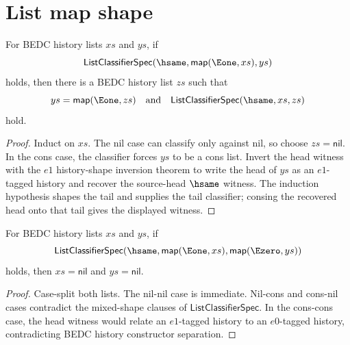 \section{List map shape}
\label{sec:list-map-shape}

\begin{theorem}
\label{thm:list-classifier-map-e1-left-shape}
For BEDC history lists $xs$ and $ys$, if
$$
\mathsf{ListClassifierSpec}(\hsame,\mathsf{map}(\Eone,xs),ys)
$$
holds, then there is a BEDC history list $zs$ such that
$$
ys=\mathsf{map}(\Eone,zs)
\quad\text{and}\quad
\mathsf{ListClassifierSpec}(\hsame,xs,zs)
$$
hold.
\end{theorem}
\begin{proof}
Induct on $xs$. The nil case can classify only against nil, so choose
$zs=\mathsf{nil}$. In the cons case, the classifier forces $ys$ to be a cons
list. Invert the head witness with the $e1$ history-shape inversion theorem to
write the head of $ys$ as an $e1$-tagged history and recover the source-head
$\hsame$ witness. The induction hypothesis shapes the tail and supplies the
tail classifier; consing the recovered head onto that tail gives the displayed
witness.
\end{proof}

\begin{theorem}
\label{thm:list-classifier-map-e1-map-e0-empty}
For BEDC history lists $xs$ and $ys$, if
$$
\mathsf{ListClassifierSpec}
  (\hsame,\mathsf{map}(\Eone,xs),\mathsf{map}(\Ezero,ys))
$$
holds, then $xs=\mathsf{nil}$ and $ys=\mathsf{nil}$.
\end{theorem}
\begin{proof}
Case-split both lists. The nil-nil case is immediate. Nil-cons and cons-nil
cases contradict the mixed-shape clauses of $\mathsf{ListClassifierSpec}$. In
the cons-cons case, the head witness would relate an $e1$-tagged history to an
$e0$-tagged history, contradicting BEDC history constructor separation.
\end{proof}
